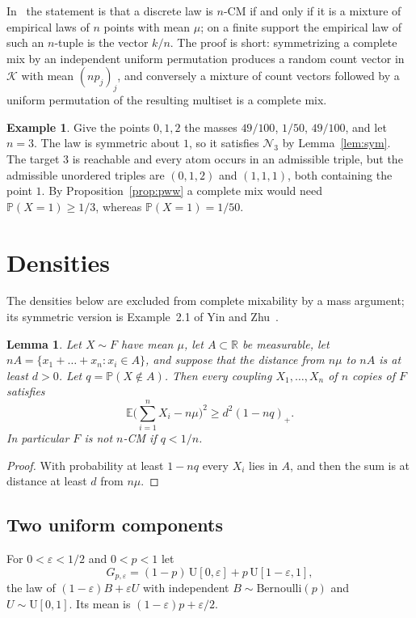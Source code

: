 \documentclass[11pt]{amsart}
\newtheorem{lemma}[theorem]{Lemma}
\theoremstyle{definition}
\newtheorem{example}[theorem]{Example}
\newcommand{\Prob}{\mathbb{P}}
\newcommand{\E}{\mathbb{E}}
\newcommand{\R}{\mathbb{R}}
\newcommand{\cN}{\mathcal{N}}
\begin{document}
In~\cite{PWW12} the statement is that a discrete law is $n$-CM if and only if it is a mixture of empirical laws of
$n$ points with mean $\mu$; on a finite support the empirical law of such an $n$-tuple is the vector $k/n$. The proof is
short: symmetrizing a complete mix by an independent uniform permutation produces a random count vector in
$\mathcal K$ with mean $(np_j)_j$, and conversely a mixture of count vectors followed by a uniform permutation of the
resulting multiset is a complete mix.

\begin{example}\label{ex:three}
Give the points $0,1,2$ the masses $49/100$, $1/50$, $49/100$, and let $n=3$. The law is symmetric about $1$, so it
satisfies $\cN_3$ by Lemma~\ref{lem:sym}. The target $3$ is reachable and every atom occurs in an admissible triple,
but the admissible unordered triples are $(0,1,2)$ and $(1,1,1)$, both containing the point $1$. By
Proposition~\ref{prop:pww} a complete mix would need $\Prob(X=1)\ge1/3$, whereas $\Prob(X=1)=1/50$.
\end{example}

\section{Densities}\label{sec:dens}

The densities below are excluded from complete mixability by a mass argument; its symmetric version is Example~2.1
of Yin and Zhu~\cite{YZ}.

\begin{lemma}\label{lem:mass}
Let $X\sim F$ have mean $\mu$, let $A\subset\R$ be measurable, let $nA=\{x_1+\dots+x_n:x_i\in A\}$, and suppose that
the distance from $n\mu$ to $nA$ is at least $d>0$. Let $q=\Prob(X\notin A)$. Then every coupling $X_1,\dots,X_n$ of
$n$ copies of $F$ satisfies
\begin{equation}\label{eq:mass}
\E\Big(\sum_{i=1}^nX_i-n\mu\Big)^2\ge d^2(1-nq)_+.
\end{equation}
In particular $F$ is not $n$-CM if $q<1/n$.
\end{lemma}

\begin{proof}
With probability at least $1-nq$ every $X_i$ lies in $A$, and then the sum is at distance at least $d$ from $n\mu$.
\end{proof}

\subsection{Two uniform components}
For $0<\varepsilon<1/2$ and $0<p<1$ let
\[
G_{p,\varepsilon}=(1-p)\,\mathrm{U}[0,\varepsilon]+p\,\mathrm{U}[1-\varepsilon,1],
\]
the law of $(1-\varepsilon)B+\varepsilon U$ with independent $B\sim\mathrm{Bernoulli}(p)$ and $U\sim\mathrm U[0,1]$. Its
mean is $(1-\varepsilon)p+\varepsilon/2$.
\end{document}
